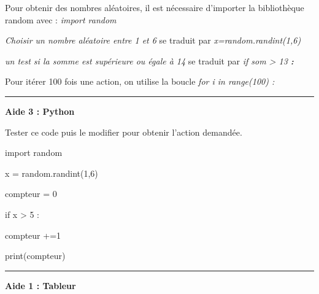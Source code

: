 \documentclass[20pt]{article}
\begin{document}
\begin{description}
\item Pour obtenir des nombres aléatoires, il est nécessaire d'importer la bibliothèque random avec : \textit{import random}

\item  \textit{Choisir un nombre aléatoire entre 1 et 6} se traduit par \textit{x=random.randint(1,6)}
 
\item  \textit{un test si la somme est supérieure ou égale à 14 } se traduit par \textit{if  som > 13 \textbf{:}}   \\
 
\item Pour itérer 100 fois une action, on utilise la boucle \textit{for i in range(100) :} 
\end{description}
\hrule
\vspace{0.2cm}

\textbf{Aide 3 : Python}

 

Tester ce code puis le modifier pour obtenir l'action demandée.

\begin{description}
\item  import random
\item  x = random.randint(1,6)
\item  compteur = 0
\item  if x > 5 :     
\item  \hspace{1cm}  compteur +=1 
\item  print(compteur)
\end{description}
\hrule
\vspace{0.2cm}

\textbf{Aide 1 : Tableur}
\end{document}
